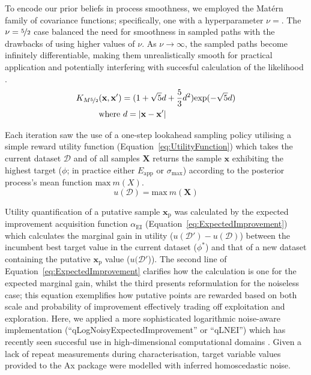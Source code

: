 To encode our prior beliefs in process smoothness, we
 employed the Mat\'{e}rn family of covariance functions; specifically,
 one with a hyperparameter \(\nu=\).
The \(\nu=\nicefrac{5}{2}\) case balanced the need for smoothness in sampled
 paths with the drawbacks of using higher values of \(\nu\). 
As \(\nu \rightarrow \infty\), the sampled paths become infinitely
 differentiable, making them unrealistically smooth for practical
 application \autocite{Snoek2012} and potentially interfering with succesful
 calculation of the likelihood \autocite{Stein1999}.
\footnotesize
\begin{equation}\label{eq:MaternCovarianceFunction}
    \begin{split}
        K_{M\nicefrac{5}{2}}&(\mathbf{x},\mathbf{x'})=(1+\sqrt{5}d+\frac{5}{3}d^{2})\mathrm{exp}(-\sqrt{5}d)\\
        &\mathrm{where}\text{ }d=|\mathbf{x}-\mathbf{x'}|
    \end{split}
\end{equation}
\normalsize

Each iteration saw the use of a one-step lookahead sampling policy utilising
 a simple reward utility function (Equation~\ref{eq:UtilityFunction}) which
 takes the current dataset \(\mathcal{D}\) and of all samples \(\mathbf{X}\)
 returns the sample \(\mathbf{x}\) exhibiting the highest target
 (\(\phi\); in practice either \(E_{\mathrm{app}}\) or \(\sigma_{\mathrm{max}}\)) according to the
 posterior process's mean function \(\mathrm{max}\ m(X)\).
\begin{equation}\label{eq:UtilityFunction}
    u(\mathcal{D})=\mathrm{max}\ m(\mathbf{X})
\end{equation}

Utility quantification of a putative sample \(\mathbf{x}_{\mathrm{p}}\) was
 calculated by the expected improvement acquisition function
 \(\alpha_{\mathrm{EI}}\) (Equation~\ref{eq:ExpectedImprovement}) which calculates
 the marginal gain in utility (\(u(\mathcal{D'})-u(\mathcal{D})\)) between
 the incumbent best target value in the current dataset (\(\phi^{*}\)) and
 that of a new dataset containing the putative \(\mathbf{x}_{\mathrm{p}}\) value
 (\(u(\mathcal{D'}\))).
The second line of Equation~\ref{eq:ExpectedImprovement} clarifies how the
 calculation is one for the expected marginal gain, whilst the third
 presents reformulation for the noiseless case; this equation exemplifies
 how putative points are rewarded based on both scale and probability of
 improvement effectively trading off exploitation and exploration.
Here, we applied a more sophisticated logarithmic noise-aware
 implementation (``qLogNoisyExpectedImprovement'' or ``qLNEI'') which has
 recently seen succesful use in high-dimensional computational domains
 \autocite{Ament2025}.
Given a lack of repeat measurements during characterisation, target variable
 values provided to the Ax package were modelled with inferred homoscedastic
 noise.


